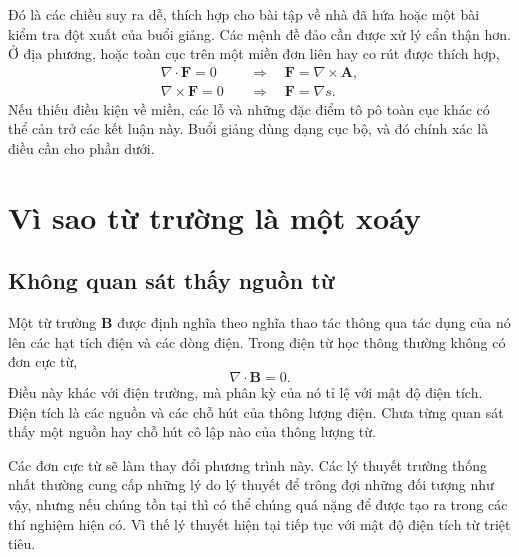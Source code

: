 Đó là các chiều suy ra dễ, thích hợp cho bài tập về nhà đã hứa hoặc một bài kiểm tra đột xuất của buổi giảng. Các mệnh đề đảo cần được xử lý cẩn thận hơn. Ở địa phương, hoặc toàn cục trên một miền đơn liên hay co rút được thích hợp,
\begin{align}
  \nabla\cdot\mathbf F=0
  &\quad\Longrightarrow\quad
  \mathbf F=\nabla\times\mathbf A,\\
  \nabla\times\mathbf F=0
  &\quad\Longrightarrow\quad
  \mathbf F=\nabla s.
\end{align}
Nếu thiếu điều kiện về miền, các lỗ và những đặc điểm tô pô toàn cục khác có thể cản trở các kết luận này. Buổi giảng dùng dạng cục bộ, và đó chính xác là điều cần cho phần dưới.

\section{Vì sao từ trường là một xoáy}

\subsection{Không quan sát thấy nguồn từ}

Một từ trường \(\mathbf B\) được định nghĩa theo nghĩa thao tác thông qua tác dụng của nó lên các hạt tích điện và các dòng điện. Trong điện từ học thông thường không có đơn cực từ,
\begin{equation}
  \nabla\cdot\mathbf B=0.
\end{equation}
Điều này khác với điện trường, mà phân kỳ của nó tỉ lệ với mật độ điện tích. Điện tích là các nguồn và các chỗ hút của thông lượng điện. Chưa từng quan sát thấy một nguồn hay chỗ hút cô lập nào của thông lượng từ.

Các đơn cực từ sẽ làm thay đổi phương trình này. Các lý thuyết trường thống nhất thường cung cấp những lý do lý thuyết để trông đợi những đối tượng như vậy, nhưng nếu chúng tồn tại thì có thể chúng quá nặng để được tạo ra trong các thí nghiệm hiện có. Vì thế lý thuyết hiện tại tiếp tục với mật độ điện tích từ triệt tiêu.

\begin{classroomqa}
\end{classroomqa}


